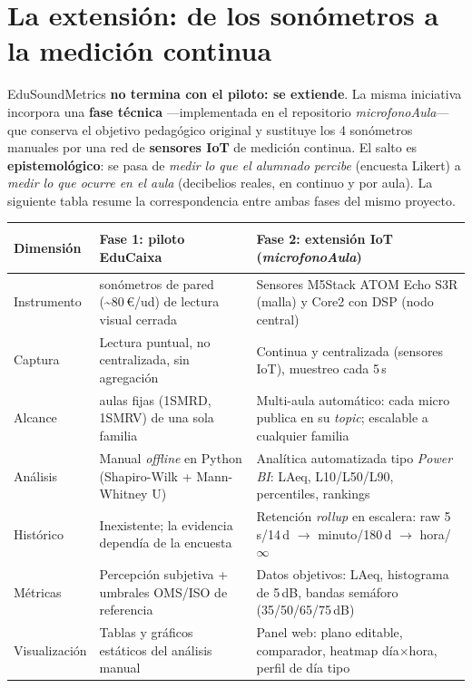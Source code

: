 \documentclass[11pt,a4paper]{article}
\begin{document}
\section{La extensi\'on: de los son\'ometros a la medici\'on continua}

EduSoundMetrics \textbf{no termina con el piloto: se extiende}. La misma iniciativa incorpora una \textbf{fase t\'ecnica} ---implementada en el repositorio \emph{microfonoAula}--- que conserva el objetivo pedag\'ogico original y sustituye los 4 son\'ometros manuales por una red de \textbf{sensores IoT} de medici\'on continua. El salto es \textbf{epistemol\'ogico}: se pasa de \emph{medir lo que el alumnado percibe} (encuesta Likert) a \emph{medir lo que ocurre en el aula} (decibelios reales, en continuo y por aula). La siguiente tabla resume la correspondencia entre ambas fases del mismo proyecto.

\begin{table}[H]
\centering\footnotesize
\renewcommand{\arraystretch}{1.2}
\begin{tabularx}{\linewidth}{@{}>{\bfseries\raggedright\arraybackslash}p{2.5cm} >{\raggedright\arraybackslash}X >{\raggedright\arraybackslash}X@{}}
\toprule
\rowcolor{TableHead} Dimensi\'on & Fase 1: piloto EduCaixa & Fase 2: extensi\'on IoT (\emph{microfonoAula}) \\
\midrule
Instrumento & 4 son\'ometros de pared (\textasciitilde80\,\euro/ud) de lectura visual cerrada & Sensores M5Stack ATOM Echo S3R (malla) y Core2 con DSP (nodo central) \\
Captura & Lectura puntual, no centralizada, sin agregaci\'on & Continua y centralizada (sensores IoT), muestreo cada 5\,s \\
Alcance & 2 aulas fijas (1SMRD, 1SMRV) de una sola familia & Multi-aula autom\'atico: cada micro publica en su \emph{topic}; escalable a cualquier familia \\
An\'alisis & Manual \emph{offline} en Python (Shapiro-Wilk + Mann-Whitney U) & Anal\'itica automatizada tipo \emph{Power BI}: LAeq, L10/L50/L90, percentiles, rankings \\
Hist\'orico & Inexistente; la evidencia depend\'ia de la encuesta & Retenci\'on \emph{rollup} en escalera: raw 5\,s/14\,d $\rightarrow$ minuto/180\,d $\rightarrow$ hora/$\infty$ \\
M\'etricas & Percepci\'on subjetiva + umbrales OMS/ISO de referencia & Datos objetivos: LAeq, histograma de 5\,dB, bandas sem\'aforo (35/50/65/75\,dB) \\
Visualizaci\'on & Tablas y gr\'aficos est\'aticos del an\'alisis manual & Panel web: plano editable, comparador, heatmap d\'ia$\times$hora, perfil de d\'ia tipo \\
\bottomrule
\end{tabularx}
\end{table}
\end{document}
